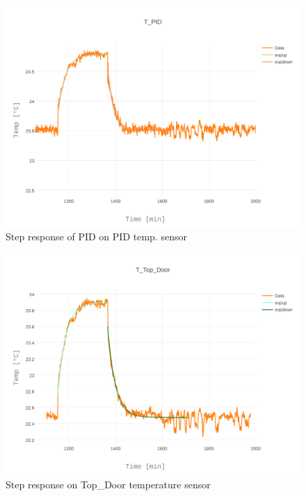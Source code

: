 \documentclass[12pt]{scrartcl}
\begin{document}
      \begin{figure}[h!]
        \centering
        \includegraphics[width = \textwidth]{./plots/plot_image(16)}
        \caption{Step response of PID on PID temp. sensor}
        \label{fig15}
      \end{figure}
      \begin{figure}[h!]
        \centering
        \includegraphics[width = \textwidth]{./plots/plot_image(17)}
        \caption{Step response on Top\_Door temperature sensor}
        \label{fig16}
      \end{figure}
      \clearpage
\end{document}
